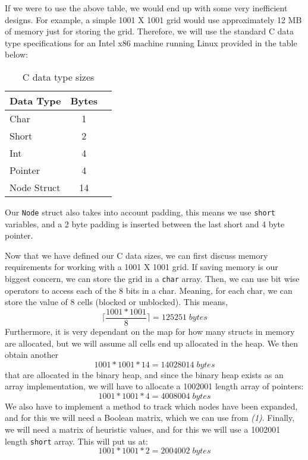 If we were to use the above table, we would end up with some very inefficient designs. For example, a simple 1001 X 1001 grid would use approximately 12 MB of memory just for storing the grid. Therefore, we will use the standard C data type specifications for an Intel x86 machine running Linux provided in the table below: 
\begin{table}[H]
  \begin{center}
    \begin{tabular}{l|c|r}
      \textbf{Data Type} & \textbf{Bytes}\\
      \hline
      Char & 1\\
      Short & 2\\
      Int & 4\\
      Pointer & 4\\
      Node Struct & 14
    \end{tabular}
    \caption{C data type sizes}
  \end{center}
\end{table}

Our \texttt{Node} struct also takes into account padding, this means we use \texttt{short} variables, and a 2 byte padding is inserted between the last short and 4 byte pointer.


Now that we have defined our C data sizes, we can first discuss memory requirements for working with a 1001 X 1001 grid. If saving memory is our biggest concern, we can store the grid in a \texttt{char} array. Then, we can use bit wise operators to access each of the 8 bits in a char. Meaning, for each char, we can store the value of 8 cells (blocked or unblocked). This means, 
\begin{equation}
\lceil\frac{1001 * 1001}{8}\rceil = 125251 \; bytes \tag{1}
\end{equation}
Furthermore, it is very dependant on the map for how many structs in memory are allocated, but we will assume all cells end up allocated in the heap. We then obtain another 
\begin{equation}
1001 * 1001 * 14 = 14028014 \; bytes \tag{2}
\end{equation}
that are allocated in the binary heap, and since the binary heap exists as an array implementation, we will have to allocate a 1002001 length array of pointers:
\begin{equation}
1001 * 1001 * 4 = 4008004 \; bytes \tag{3}
\end{equation}
We also have to implement a method to track which nodes have been expanded, and for this we will need a Boolean matrix, which we can use from \emph{(1)}. Finally, we will need a matrix of heuristic values, and for this we will use a 1002001 length \texttt{short} array. This will put us at:
\begin{equation}
1001 * 1001 * 2 = 2004002 \; bytes \tag{4}
\end{equation}

